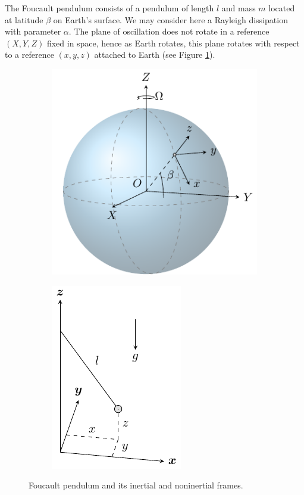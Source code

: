 \documentclass{aims}
\numberwithin{equation}{section}
\theoremstyle{definition}
\begin{document}
 The Foucault pendulum consists of a pendulum of length $l$ and mass $m$ located at latitude $\beta$ on Earth's surface. We may consider here a Rayleigh dissipation with parameter $\alpha$. The plane of oscillation does not rotate in a reference $(X, Y, Z)$ fixed in space, hence as Earth rotates, this plane rotates with respect to a reference $(x, y, z)$ attached to Earth (see Figure \ref{fig:pendulo_de_foucault}). 
\begin{figure}
  \centering
  \begin{subfigure}[b]{0.45\textwidth}
  \centering
    \includegraphics{fig/pendulo_de_foucault.pdf}
  \end{subfigure}
  \begin{subfigure}[b]{0.45\textwidth}
  \centering
    \includegraphics{fig/pendulo_de_foucault_ejes_no_inerciales.pdf}
  \end{subfigure}
  \caption{Foucault pendulum and its inertial and noninertial frames.}
  \label{fig:pendulo_de_foucault}
\end{figure}
\end{document}
